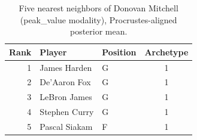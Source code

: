 \begin{table}[htbp]
  \centering\small
  \begin{tabular}{rllc}
    \toprule
    Rank & Player & Position & Archetype \\
    \midrule
    1 & James Harden & G & 1 \\
    2 & De'Aaron Fox & G & 1 \\
    3 & LeBron James & G & 1 \\
    4 & Stephen Curry & G & 1 \\
    5 & Pascal Siakam & F & 1 \\
    \bottomrule
  \end{tabular}
  \caption{Five nearest neighbors of Donovan Mitchell (peak_value modality), Procrustes-aligned posterior mean.}
  \label{tab:Donovan_Mitchell_neighbors_peak_value}
\end{table}

